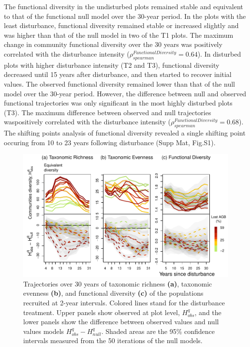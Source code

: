 \documentclass[fleqn,10pt]{ArtEcoFoG} %
\begin{document}
The functional diversity in the undisturbed plots remained stable and equivalent to that of the functional null model over the 30-year period. In the plots with the least disturbance, functional diversity remained stable or increased slightly and was higher than that of the null model in two of the T1 plots.
The maximum change in community functional diversity over the 30 years was positively correlated with the disturbance intensity (\(\rho^{FunctionalDiversity}_{spearman}=0.64\)).
In disturbed plots with higher disturbance intensity (T2 and T3), functional diversity decreased until 15 years after disturbance, and then started to recover initial values. The observed functional diversity remained lower than that of the null model over the 30-year period.
However, the difference between null and observed functional trajectories was only significant in the most highly disturbed plots (T3). The maximum difference between observed and null trajectories waspositively correlated with the disturbance intensity (\(\rho^{FunctionalDiversity}_{spearman}=0.68\)).
The shifting points analysis of functional diversity revealed a single shifting point occuring from 10 to 23 years following disturbance (Supp Mat, Fig.S1).

\begin{figure}

{\centering \includegraphics{RecruitmentTrajectories_files/figure-latex/DivTraj-1} 

}

\caption{Trajectories over 30 years of taxonomic richness \textbf{(a)}, taxonomic evenness \textbf{(b)}, and functional diversity \textbf{(c)} of the populations recruited at 2-year intervals. Colored lines stand for the disturbance treatment. Upper panels show observed at plot level, $H_{obs}^q$, and the lower panels show the difference between observed values and null values models $H_{obs}^q - H_{null}^q$. Shaded areas are the 95\% confidence intervals measured from the 50 iterations of the null models.}\label{fig:DivTraj}
\end{figure}
\end{document}
